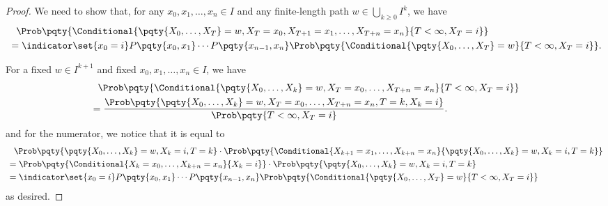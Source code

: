 \begin{proof}
    We need to show that, for any \(x_0, x_1, \ldots, x_n \in I\) and any finite-length path \(w \in \bigcup_{k \geq 0} I^k\), we have
    \begin{align*}
        &\phantom{=} \Prob\pqty{\Conditional{\pqty{X_0, \ldots, X_T} = w, X_T = x_0, X_{T + 1} = x_1, \ldots, X_{T + n} = x_n}{T < \infty, X_T = i}} \\
        &= \indicator\set{x_0 = i} P\pqty{x_0, x_1} \cdots P\pqty{x_{n - 1}, x_n} \Prob\pqty{\Conditional{\pqty{X_0, \ldots, X_T} = w}{T < \infty, X_T = i}}.
    \end{align*}

    For a fixed \(w \in I^{k + 1}\) and fixed \(x_0, x_1, \ldots, x_n \in I\), we have
    \begin{align*}
        &\phantom{=} \Prob\pqty{\Conditional{\pqty{X_0, \ldots, X_k} = w, X_T = x_0, \ldots, X_{T + n} = x_n}{T < \infty, X_T = i}} \\
        &= \frac{\Prob\pqty{\pqty{X_0, \ldots, X_k} = w, X_T = x_0, \ldots, X_{T + n} = x_n, T = k, X_k = i}}{\Prob\pqty{T < \infty, X_T = i}}.
    \end{align*}
    and for the numerator, we notice that it is equal to
    \begin{align*}
        &\phantom{=} \Prob\pqty{\pqty{X_0, \ldots, X_k} = w, X_k = i, T = k} \cdot \Prob\pqty{\Conditional{X_{k + 1} = x_1, \ldots, X_{k + n} = x_n}{\pqty{X_0, \ldots, X_k} = w, X_k = i, T = k}} \\
        &= \Prob\pqty{\Conditional{X_k = x_0, \ldots, X_{k + n} = x_n}{X_k = i}} \cdot \Prob\pqty{\pqty{X_0, \ldots, X_k} = w, X_k = i, T = k} \\
        &= \indicator \set{x_0 = i} P\pqty{x_0, x_1} \cdots P\pqty{x_{n - 1}, x_n} \Prob\pqty{\Conditional{\pqty{X_0, \ldots, X_T} = w}{T < \infty, X_T = i}}
    \end{align*}
    as desired.
\end{proof}

